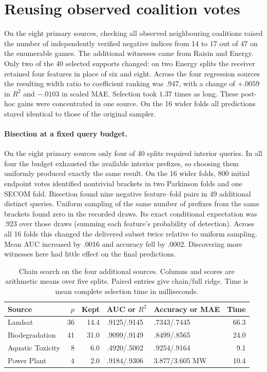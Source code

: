 \section{Reusing observed coalition votes}
\label{sec:chain-evidence}
On the eight primary sources, checking all observed neighbouring coalitions
raised the number of independently verified negative indices from 14 to 17
out of 47 on the enumerable games. The additional witnesses came from Raisin
and Energy. Only two of the 40 selected supports changed: on two Energy
splits the receiver retained four features in place of six and eight.
Across the four regression sources the resulting width ratio to coefficient
ranking was .947, with a change of $+.0059$ in $R^2$ and $-.0103$ in scaled
MAE. Selection took $1.37$ times as long. These post-hoc gains were
concentrated in one source. On the 16 wider folds all predictions stayed
identical to those of the original sampler.

\paragraph{Bisection at a fixed query budget.}
On the eight primary sources only four of 40 splits required interior queries.
In all four the budget exhausted the available interior prefixes, so choosing
them uniformly produced exactly the same result. On the 16 wider folds,
800 initial endpoint votes identified nontrivial brackets in two Parkinson
folds and one SECOM fold.
Bisection found nine negative feature--fold pairs in 49 additional distinct
queries. Uniform sampling of the same number of prefixes from the same
brackets found zero in the recorded draws. Its exact conditional expectation
was .923 over those draws (summing each feature's probability of detection).
Across all 16 folds this changed the delivered subset twice relative to uniform
sampling. Mean AUC increased by .0016 and accuracy fell by .0002. Discovering
more witnesses here had little effect on the final predictions.

\begin{table}[t]
\centering\small
\caption{Chain search on the four additional sources. Columns and scores
are arithmetic means over five splits. Paired entries give chain/full ridge.
Time is mean complete selection time in milliseconds.}
\label{tab:chain-four}
\begin{tabular}{@{}lrrllr@{}}
\toprule
Source & $p$ & Kept & AUC or $R^2$ & Accuracy or MAE & Time\\
\midrule
Landsat           & 36 & 14.4 & .9125/.9145 & .7343/.7445 & 66.3\\
Biodegradation    & 41 & 31.0 & .9099/.9149 & .8499/.8565 & 24.0\\
Aquatic Toxicity  &  8 &  6.0 & .4920/.5002 & .9254/.9164 &  9.1\\
Power Plant       &  4 &  2.0 & .9184/.9306 & 3.877/3.605 MW & 10.4\\
\bottomrule
\end{tabular}
\end{table}

